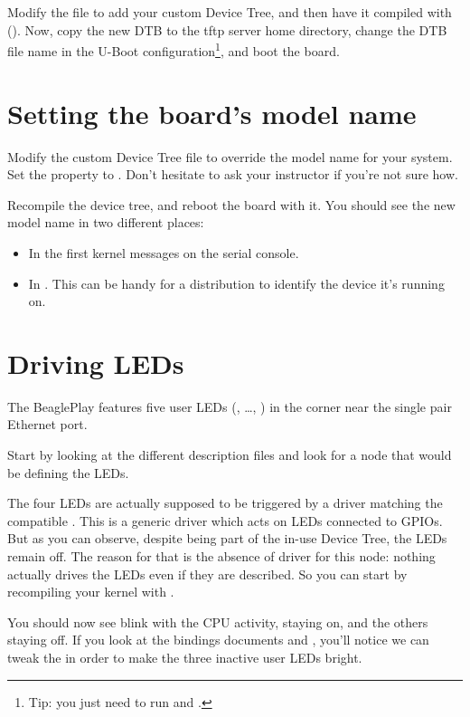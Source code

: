 Modify the  file to add your custom
Device Tree, and then have it compiled with (). Now,
copy the new DTB to the tftp server home directory, change the DTB file
name in the U-Boot configuration\footnote{Tip: you just need to run
 and .}, and boot the board.

\section{Setting the board's model name}

Modify the custom Device Tree file to override the model name for your
system. Set the  property to . Don't hesitate to ask your instructor if you're not sure how.

Recompile the device tree, and reboot the board with it. You should see
the new model name in two different places:

\begin{itemize}
\item In the first kernel messages on the serial console.
\item In . This can be
      handy for a distribution to identify the device it's running on.
\end{itemize}

\section{Driving LEDs}

The BeaglePlay features five user LEDs (, \ldots, )
in the corner near the single pair Ethernet port.

Start by looking at the different description files and look for a node
that would be defining the LEDs.

The four LEDs are actually supposed to be triggered by a driver matching
the compatible . This is a generic driver which acts on
LEDs connected to GPIOs. But as you can observe, despite being part of
the in-use Device Tree, the LEDs remain off. The reason for that is the
absence of driver for this node: nothing actually drives the LEDs even
if they are described. So you can start by recompiling your kernel with
.

You should now see  blink with the CPU activity, 
staying on, and the others staying off. If you look at the bindings documents
 and
, you'll notice we
can tweak the  in order to make the three inactive user
LEDs bright.

